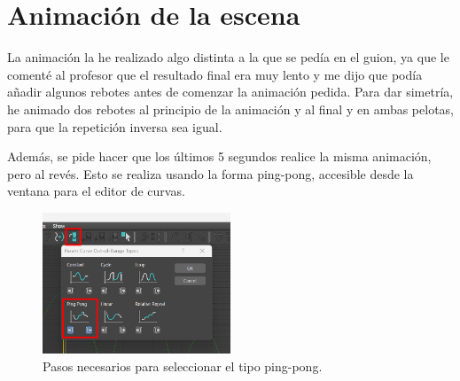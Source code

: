 

\section{Animación de la escena}

La animación la he realizado algo distinta a la que se pedía en el guion, ya que le comenté al profesor que el resultado final era muy lento y me dijo que podía añadir algunos rebotes antes de comenzar la animación pedida. Para dar simetría, he animado dos rebotes al principio de la animación y al final y en ambas pelotas, para que la repetición inversa sea igual. 

\bigskip

Además, se pide hacer que los últimos 5 segundos realice la misma animación, pero al revés. Esto se realiza usando la forma ping-pong, accesible desde la ventana para el editor de curvas.

\begin{figure}[H]
   \centering
   \includegraphics[width=0.5\textwidth]{imagenes/misc/ping-pong.png}
   \caption{Pasos necesarios para seleccionar el tipo ping-pong.}
\end{figure}

